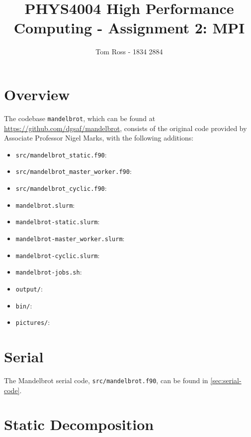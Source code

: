 \documentclass{article}
\title{PHYS4004 High Performance Computing - Assignment 2: MPI}
\author{Tom Ross - 1834 2884}
\date{}
\begin{document}
\tableofcontents

\newpage
\section{Overview}
\label{sec:overview}

The codebase \lstinline[style=ff]{mandelbrot}, which can be found at
\url{https://github.com/dgsaf/mandelbrot}, consists of the original code
provided by Associate Professor Nigel Marks, with the following additions:
\begin{itemize}
\item \lstinline[style=ff]{src/mandelbrot_static.f90}:

\item \lstinline[style=ff]{src/mandelbrot_master_worker.f90}:

\item \lstinline[style=ff]{src/mandelbrot_cyclic.f90}:

\item \lstinline[style=ff]{mandelbrot.slurm}:

\item \lstinline[style=ff]{mandelbrot-static.slurm}:

\item \lstinline[style=ff]{mandelbrot-master_worker.slurm}:

\item \lstinline[style=ff]{mandelbrot-cyclic.slurm}:

\item \lstinline[style=ff]{mandelbrot-jobs.sh}:

\item \lstinline[style=ff]{output/}:

\item \lstinline[style=ff]{bin/}:

\item \lstinline[style=ff]{pictures/}:

\end{itemize}

\newpage
\section{Serial}
\label{sec:serial}

The Mandelbrot serial code, \lstinline[style=ff]{src/mandelbrot.f90}, can be
found in \autoref{sec:serial-code}.

\newpage
\section{Static Decomposition}
\label{sec:static}
\end{document}
